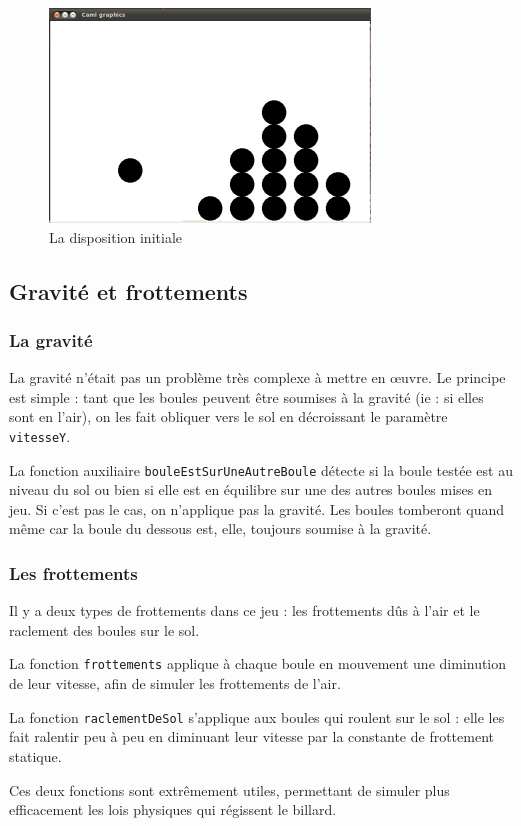 \documentclass[10pt]{article}
\begin{document}
\begin{figure}
 \centering
\includegraphics{rapport1.png}
\caption{La disposition initiale}
\end{figure}

\subsection{Gravité et frottements}
\subsubsection{La gravité}
La gravité n'était pas un problème très complexe à mettre en œuvre. Le principe est simple : tant que les boules peuvent être soumises à
la gravité (ie : si elles sont en l'air), on les fait obliquer vers le sol en décroissant le paramètre \texttt{vitesseY}.
\par La fonction auxiliaire \texttt{bouleEstSurUneAutreBoule} détecte si la boule testée est au niveau du sol ou bien si elle est
en équilibre sur une des autres boules mises en jeu. Si c'est pas le cas, on n'applique pas la gravité. Les boules tomberont quand même car la boule du dessous est, elle, toujours soumise à la gravité.
\subsubsection{Les frottements}
Il y a deux types de frottements dans ce jeu : les frottements dûs à l'air et le raclement des boules sur le sol.
\par La fonction \texttt{frottements} applique à chaque boule en mouvement une diminution de leur vitesse, afin de simuler les frottements
de l'air.
\par La fonction \texttt{raclementDeSol} s'applique aux boules qui roulent sur le sol : elle les fait ralentir peu à peu en diminuant
leur vitesse par la constante de frottement statique.
\par Ces deux fonctions sont extrêmement utiles, permettant de simuler plus efficacement les lois physiques qui régissent le billard.
\end{document}
